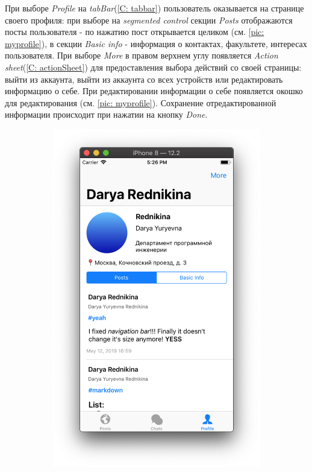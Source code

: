 \documentclass[a4paper,12pt]{article}
\begin{document}
	При выборе \textit{Profile} на \textit{tabBar}(\ref{C: tabbar}) пользователь оказывается на странице своего профиля: при выборе на \textit{segmented control} секции \textit{Posts} отображаются посты пользователя - по нажатию пост открывается целиком (см. \ref{pic: myprofile}), в секции \textit{Basic info} - информация о контактах, факультете, интересах пользователя. При выборе \textit{More} в правом верхнем углу появляется \textit{Action sheet}(\ref{C: actionSheet}) для предоставления выбора действий со своей страницы: выйти из аккаунта, выйти из аккаунта со всех устройств или редактировать информацию о себе. При редактировании информации о себе появляется окошко для редактирования (см. \ref{pic: myprofile}). Сохранение отредактированной информации происходит при нажатии на кнопку \textit{Done}.
	
	\begin{figure}[h!]
		\centering
		\begin{subfigure}[b]{0.3\linewidth}
			\includegraphics[width=\linewidth]{../includes/pmi/profile.png}

\end{subfigure}
\end{figure}
\end{document}
